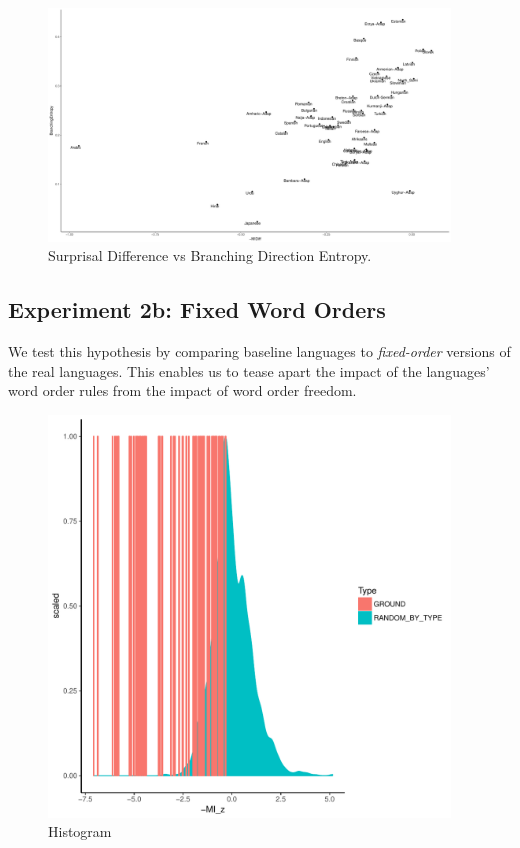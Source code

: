 \documentclass[11pt,letterpaper]{article}
\begin{document}
\begin{figure}
\includegraphics[width=0.95\textwidth]{neural/figures/surprisal-branching-entropy-REAL.pdf}
	\caption{Surprisal Difference vs Branching Direction Entropy.}\label{fig:hist-real}
\end{figure}






\subsection{Experiment 2b: Fixed Word Orders}

We test this hypothesis by comparing baseline languages to \emph{fixed-order} versions of the real languages.
This enables us to tease apart the impact of the languages' word order rules from the impact of word order freedom.


\begin{figure}
\includegraphics[width=0.95\textwidth]{neural/figures/full-GROUND-listener-surprisal-memory-HIST_z_byMem_onlyWordForms_boundedVocab.pdf}
	\caption{Histogram}\label{fig:hist-real}
\end{figure}
\end{document}
